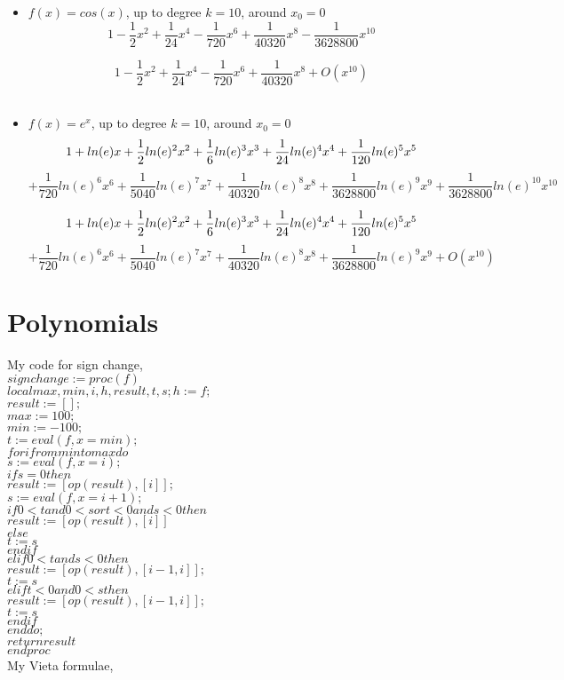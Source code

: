 \documentclass[12pt]{article}
\begin{document}
\begin{itemize}
\item $f(x)=cos(x)$, up to degree $k=10$, around $x_0=0$
$$1-\frac{1}{2}x^2+\frac{1}{24}x^4-\frac{1}{720}x^6+\frac{1}{40320}x^8-\frac{1}{3628800}x^{10}$$

$$1-\frac{1}{2}x^2+\frac{1}{24}x^4-\frac{1}{720}x^6+\frac{1}{40320}x^8+O(x^{10})$$\\

\item $f(x)=e^{x}$, up to degree $k=10$, around $x_0=0$
$$1+ln(e)x+\frac{1}{2}ln(e)^2x^2+\frac{1}{6}ln(e)^3x^3+\frac{1}{24}ln(e)^4x^4+\frac{1}{120}ln(e)^5x^5\\$$
$$+\frac{1}{720}ln(e)^6x^6+\frac{1}{5040}ln(e)^7x^7+\frac{1}{40320}ln(e)^8x^8+\frac{1}{3628800}ln(e)^9x^9+\frac{1}{3628800}ln(e)^{10}x^{10}$$

$$1+ln(e)x+\frac{1}{2}ln(e)^2x^2+\frac{1}{6}ln(e)^3x^3+\frac{1}{24}ln(e)^4x^4+\frac{1}{120}ln(e)^5x^5\\$$
$$+\frac{1}{720}ln(e)^6x^6+\frac{1}{5040}ln(e)^7x^7+\frac{1}{40320}ln(e)^8x^8+\frac{1}{3628800}ln(e)^9x^9+O(x^{10})$$
\end{itemize}
\section{Polynomials}
My code for sign change,\\

$signchange := proc (f)$\\
$local max, min, i, h, result, t, s; h := f;$\\
$result := [];$\\
$max := 100;$\\
$min := -100;$\\
$t := eval(f, x = min);$\\
$for i from min to max do$\\
$s := eval(f, x = i);$\\
$if s = 0 then$\\
$result := [op(result), [i]];$\\
$s := eval(f, x = i+1);$\\
$if 0 < t and 0 < s or t < 0 and s < 0 then$\\
$result := [op(result), [i]]$\\
$else$\\
$t := s$\\
$end if$\\
$elif 0 < t and s < 0 then$\\
$result := [op(result), [i-1, i]];$\\
$t := s$\\
$elif t < 0 and 0 < s then$\\
$result := [op(result), [i-1, i]];$\\
$t := s$\\
$end if$\\
$end do;$\\
$return result$\\
$end proc$\\
\clearpage
My Vieta formulae,\\
\end{document}
